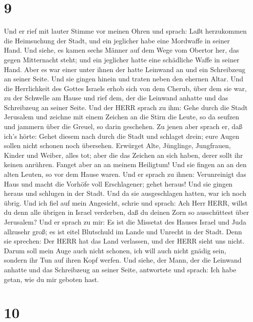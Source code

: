 \hypertarget{section-8}{%
\section{9}\label{section-8}}

 Und er rief mit lauter Stimme vor meinen Ohren und sprach:
Laßt herzukommen die Heimsuchung der Stadt, und ein jeglicher habe eine
Mordwaffe in seiner Hand.  Und siehe, es kamen sechs Männer
auf dem Wege vom Obertor her, das gegen Mitternacht steht; und ein
jeglicher hatte eine schädliche Waffe in seiner Hand. Aber es war einer
unter ihnen der hatte Leinwand an und ein Schreibzeug an seiner Seite.
Und sie gingen hinein und traten neben den ehernen Altar. 
Und die Herrlichkeit des Gottes Israels erhob sich von dem Cherub, über
dem sie war, zu der Schwelle am Hause und rief dem, der die Leinwand
anhatte und das Schreibzeug an seiner Seite.  Und der HERR
sprach zu ihm: Gehe durch die Stadt Jerusalem und zeichne mit einem
Zeichen an die Stirn die Leute, so da seufzen und jammern über die
Greuel, so darin geschehen.  Zu jenen aber sprach er, daß
ich's hörte: Gehet diesem nach durch die Stadt und schlaget drein; eure
Augen sollen nicht schonen noch übersehen.  Erwürget Alte,
Jünglinge, Jungfrauen, Kinder und Weiber, alles tot; aber die das
Zeichen an sich haben, derer sollt ihr keinen anrühren. Fanget aber an
an meinem Heiligtum! Und sie fingen an an den alten Leuten, so vor dem
Hause waren.  Und er sprach zu ihnen: Verunreinigt das Haus
und macht die Vorhöfe voll Erschlagener; gehet heraus! Und sie gingen
heraus und schlugen in der Stadt.  Und da sie ausgeschlagen
hatten, war ich noch übrig. Und ich fiel auf mein Angesicht, schrie und
sprach: Ach Herr HERR, willst du denn alle übrigen in Israel verderben,
daß du deinen Zorn so ausschüttest über Jerusalem?  Und er
sprach zu mir: Es ist die Missetat des Hauses Israel und Juda allzusehr
groß; es ist eitel Blutschuld im Lande und Unrecht in der Stadt. Denn
sie sprechen: Der HERR hat das Land verlassen, und der HERR sieht uns
nicht.  Darum soll mein Auge auch nicht schonen, ich will
auch nicht gnädig sein, sondern ihr Tun auf ihren Kopf werfen.
 Und siehe, der Mann, der die Leinwand anhatte und das
Schreibzeug an seiner Seite, antwortete und sprach: Ich habe getan, wie
du mir geboten hast.

\hypertarget{section-9}{%
\section{10}\label{section-9}}

